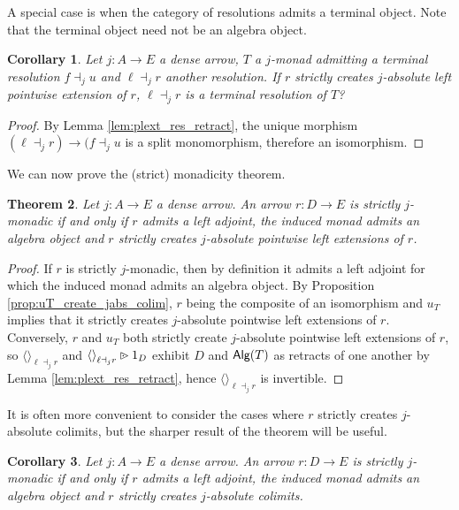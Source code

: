 \documentclass[10pt,a4paper]{article}
\newcommand{\cat}[1]{\textcat{#1}}
\newcommand{\textcat}[1]{{\normalfont\textsf{#1}}}
\newcommand{\plext}{\mathbin{{\rhd}\mathclap{\mspace{-17.5mu}\cdot}}}
\newcommand{\tp}[1]{\langle#1\rangle}
\newcommand{\unit}{{\tp{}}}
\DeclareMathOperator{\Alg}{\cat{Alg}}
\theoremstyle{plain}
\newtheorem{theorem}{Theorem}[subsection]
\newtheorem{corollary}[theorem]{Corollary}
\theoremstyle{definition}
\theoremstyle{remark}
\begin{document}
A special case is when the category of resolutions admits a terminal object. Note that the terminal object need not be an algebra object.

\begin{corollary}
    Let $j : A\to E$ a dense arrow, $T$ a $j$-monad admitting a terminal resolution $f \dashv_ju$ and $\ell\dashv_jr$ another resolution. If $r$ strictly creates $j$-absolute left pointwise extension of $r$, $\ell\dashv_jr$ is a terminal resolution of $T$?
\end{corollary}

\begin{proof}
    By Lemma \ref{lem:plext_res_retract}, the unique morphism $(\ell\dashv_jr)\to(f\dashv_ju$ is a split monomorphism, therefore an isomorphism.
\end{proof}

We can now prove the (strict) monadicity theorem.

\begin{theorem}
    \label{th:strict_monadicity}
    Let $j : A \to E$ a dense arrow. An arrow $r : D \to E$ is strictly $j$-monadic if and only if $r$ admits a left adjoint, the induced monad admits an algebra object and $r$ strictly creates $j$-absolute pointwise left extensions of $r$.
\end{theorem}

\begin{proof}
    If $r$ is strictly $j$-monadic, then by definition it admits a left adjoint for which the induced monad admits an algebra object. By Proposition \ref{prop:uT_create_jabs_colim}, $r$ being the composite of an isomorphism and $u_T$ implies that it strictly creates $j$-absolute pointwise left extensions of $r$.\\
    Conversely, $r$ and $u_T$ both strictly create $j$-absolute pointwise left extensions of $r$, so $\unit_{\ell\dashv_jr}$ and $\unit_{\ell\dashv_jr}\plext 1_D$ exhibit $D$ and $\Alg(T)$ as retracts of one another by Lemma \ref{lem:plext_res_retract}, hence $\unit_{\ell\dashv_jr}$ is invertible.
\end{proof}

It is often more convenient to consider the cases where $r$ strictly creates $j$-absolute colimits, but the sharper result of the theorem will be useful.

\begin{corollary}
    Let $j : A \to E$ a dense arrow. An arrow $r : D \to E$ is strictly $j$-monadic if and only if $r$ admits a left adjoint, the induced monad admits an algebra object and $r$ strictly creates $j$-absolute colimits.
\end{corollary}
\end{document}
